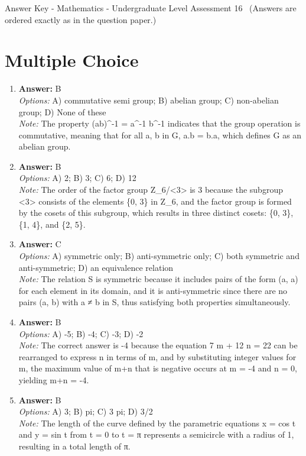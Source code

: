 \documentclass[12pt]{article}
\begin{document}
\begin{center}
Answer Key - Mathematics - Undergraduate Level Assessment 16 \
\small (Answers are ordered exactly as in the question paper.)
\end{center}

\section*{Multiple Choice}
\begin{enumerate}[label=\arabic*.]
\item \textbf{Answer:} B
\\ \textit{Options:} A) commutative semi group; B) abelian group; C) non-abelian group; D) None of these
\\ \textit{Note:} The property (ab)^-1 = a^-1 b^-1 indicates that the group operation is commutative, meaning that for all a, b in G, a.b = b.a, which defines G as an abelian group.
\item \textbf{Answer:} B
\\ \textit{Options:} A) 2; B) 3; C) 6; D) 12
\\ \textit{Note:} The order of the factor group Z\_6/\textless{}3\textgreater{} is 3 because the subgroup \textless{}3\textgreater{} consists of the elements \{0, 3\} in Z\_6, and the factor group is formed by the cosets of this subgroup, which results in three distinct cosets: \{0, 3\}, \{1, 4\}, and \{2, 5\}.
\item \textbf{Answer:} C
\\ \textit{Options:} A) symmetric only; B) anti-symmetric only; C) both symmetric and anti-symmetric; D) an equivalence relation
\\ \textit{Note:} The relation S is symmetric because it includes pairs of the form (a, a) for each element in its domain, and it is anti-symmetric since there are no pairs (a, b) with a ≠ b in S, thus satisfying both properties simultaneously.
\item \textbf{Answer:} B
\\ \textit{Options:} A) -5; B) -4; C) -3; D) -2
\\ \textit{Note:} The correct answer is -4 because the equation 7 m + 12 n = 22 can be rearranged to express n in terms of m, and by substituting integer values for m, the maximum value of m+n that is negative occurs at m = -4 and n = 0, yielding m+n = -4.
\item \textbf{Answer:} B
\\ \textit{Options:} A) 3; B) pi; C) 3 pi; D) 3/2
\\ \textit{Note:} The length of the curve defined by the parametric equations x = cos t and y = sin t from t = 0 to t = π represents a semicircle with a radius of 1, resulting in a total length of π.
\end{enumerate}
\end{document}
